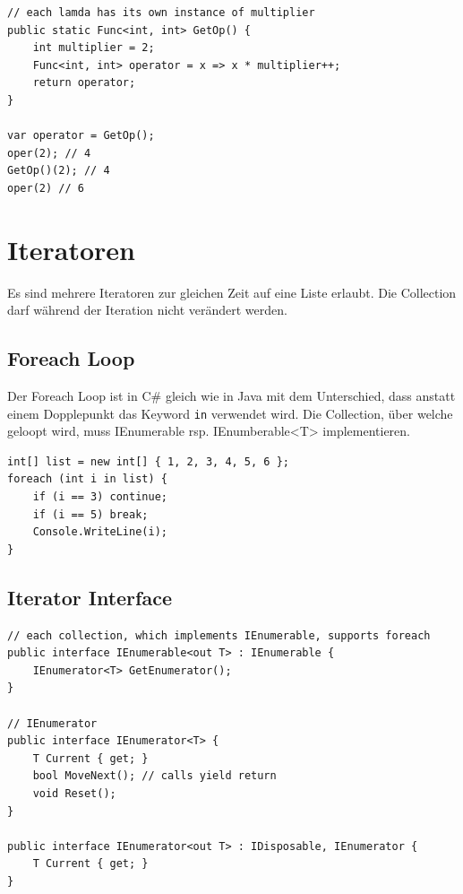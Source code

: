 \begin{lstlisting}
// each lamda has its own instance of multiplier
public static Func<int, int> GetOp() {
	int multiplier = 2;
	Func<int, int> operator = x => x * multiplier++;
	return operator;
}

var operator = GetOp();
oper(2); // 4
GetOp()(2); // 4
oper(2) // 6
\end{lstlisting}


\section{Iteratoren}
Es sind mehrere Iteratoren zur gleichen Zeit auf eine Liste erlaubt. Die Collection darf während der Iteration nicht verändert werden. 

\subsection{Foreach Loop}
Der Foreach Loop ist in C\# gleich wie in Java mit dem Unterschied, dass anstatt einem Dopplepunkt das Keyword \lstinline|in| verwendet wird. Die Collection, über welche geloopt wird, muss IEnumerable rsp. IEnumberable<T> implementieren. 
\begin{lstlisting}
int[] list = new int[] { 1, 2, 3, 4, 5, 6 };
foreach (int i in list) {
	if (i == 3) continue;
	if (i == 5) break;
	Console.WriteLine(i);
}
\end{lstlisting}

\subsection{Iterator Interface}
\begin{lstlisting}
// each collection, which implements IEnumerable, supports foreach
public interface IEnumerable<out T> : IEnumerable {
	IEnumerator<T> GetEnumerator();
}

// IEnumerator
public interface IEnumerator<T> {
	T Current { get; }
	bool MoveNext(); // calls yield return
	void Reset();
}

public interface IEnumerator<out T> : IDisposable, IEnumerator {
	T Current { get; }
}
\end{lstlisting}

\clearpage

